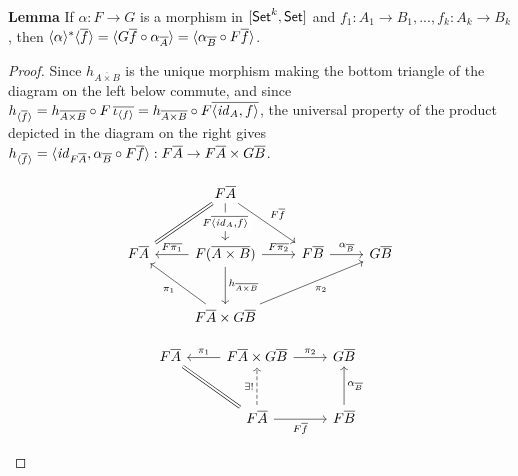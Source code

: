 \documentclass[runningheads]{llncs}
\renewcommand{\id}{\mathit{id}}
\renewcommand{\id}{\mathit{id}}
\begin{document}
\noindent
{\bf Lemma}
If $\alpha : F \to G$ is a morphism in $[\mathsf{Set}^k, \mathsf{Set}]$
and $f_1: A_1 \to B_1, ..., f_k : A_k \to B_k$,
then $\langle {\alpha} \rangle^* \langle {\overline{f}} \rangle
= \langle G \overline{f} \circ \alpha_{\overline{A}} \rangle
= \langle \alpha_{\overline{B}} \circ F \overline{f} \rangle$.


\begin{proof}
Since $h_{\overline{A \times B}}$ is the unique morphism making the
bottom triangle of the diagram on the left below commute, and since
$h_{\graph{\overline{f}}} = h_{\overline{A \times B}} \circ F
\,\ol{\iota_{\graph{f}}} = h_{\overline{A \times B}} \circ F
\overline{\langle \id_A, f \rangle}$, the universal property of the
product depicted in the diagram on the right gives
$h_{\graph{\overline{f}}} = \langle \id_{F \ol{A}}, \alpha_{\ol{B}}
\circ F\ol{f} \rangle : F \ol{A} \to F \ol{A} \times G \ol{B}$.

\begin{figure*}[h]
  \vspace*{-0.15in}
  \begin{minipage}[b]{0.45\linewidth}
{\footnotesize
\[\begin{tikzcd}[row sep = large]
        &F\overline{A}
        \ar[d, "{F \overline{\langle \id_A, f \rangle}}" description]
        \ar[dl, equal]
        \ar[dr, "{F\ol{f}}"]\\
        F\overline{A}
        &F(\overline{A \times B})
        \ar[l, "{F\overline{\pi_1}}"']
        \ar[r, "{F\overline{\pi_2}}"]
        \ar[d, "{h_{\overline{A \times B}}}"]
        &F\overline{B}
        \ar[r, "{\alpha_{\ol{B}}}"]
        &G\overline{B}\\
        &F\overline{A} \times G\overline{B}
        \ar[ul, "{\pi_1}"] \ar[urr, "{\pi_2}"']
\end{tikzcd}\]}
\end{minipage}
  \hspace*{0.5in}
  \begin{minipage}[b]{0.45\linewidth}
{\footnotesize
\[
      \begin{tikzcd}[row sep = large]
          F\overline{A}
          &F\overline{A} \times G\overline{B}
          \ar[l, "{\pi_1}"'] \ar[r, "{\pi_2}"]
          &G\overline{B}\\
          &F\overline{A}
          \ar[u, dashed, "{\exists !}"]
          \ar[ul, equal]
          \ar[r, "{F\ol{f}}"']
          &F{\ol{B}}
          \ar[u, "{\alpha_{\ol{B}}}"']
      \end{tikzcd}
      \]}
\end{minipage}
\end{figure*}


\end{proof}
\end{document}
